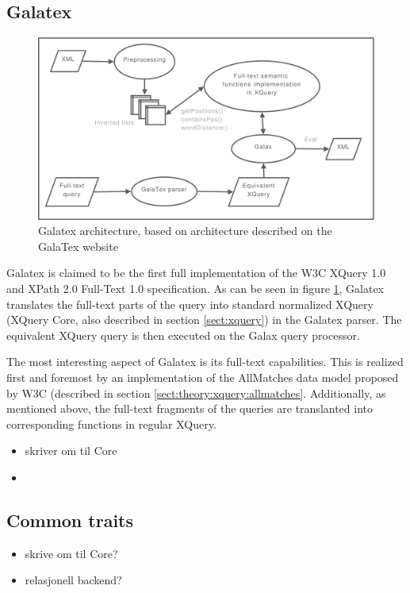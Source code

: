 \subsection{Galatex}
\begin{figure}[h]
  \centering
    \includegraphics[width=1\textwidth]{diagrams/galatex_arch}
  \caption[GalaTex architecture]{Galatex architecture, based on architecture described on
  the GalaTex website\cite{galatex}}
  \label{figure:galatex:arch}
\end{figure}
Galatex is claimed to be the first full implementation of the W3C XQuery 1.0 
and XPath 2.0 Full-Text 1.0 specification\cite{w3c01}. As can be seen in figure
\ref{figure:galatex:arch}, Galatex translates the full-text parts of the query
into standard normalized XQuery (XQuery Core\cite{xquery_semantics}, also
described in section \ref{sect:xquery}) in the Galatex parser. The equivalent
XQuery query is then executed on the Galax query processor.

The most interesting aspect of Galatex is its full-text capabilities. This is
realized first and foremost by an implementation of the AllMatches data model
proposed by W3C (described in section \ref{sect:theory:xquery:allmatches}.
Additionally, as mentioned above, the full-text fragments of the queries are
translanted into corresponding functions in regular XQuery. 

\begin{itemize}
    \item skriver om til Core
    \item 
\end{itemize}

\subsection{Common traits}
\begin{itemize}
    \item skrive om til Core?
    \item relasjonell backend?
\end{itemize}


